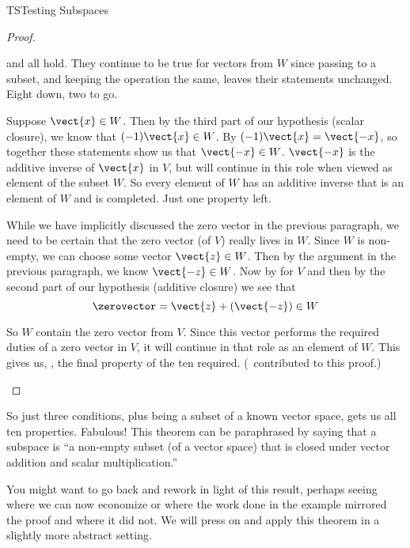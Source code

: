\begin{subsect}{TS}{Testing Subspaces}
\begin{proof}
\begin{para}
 and
all hold.  They continue to be true for vectors from $W$ since passing to a subset, and keeping the operation the same, leaves their statements unchanged.  Eight down, two to go.\end{para}
%
\begin{para}Suppose $\vect{x}\in W$.  Then by the third part of our hypothesis (scalar closure), we know that $(-1)\vect{x}\in W$.  By  $(-1)\vect{x}=\vect{-x}$, so together these statements show us that $\vect{-x}\in W$.  $\vect{-x}$ is the additive inverse of $\vect{x}$ in $V$, but will continue in this role when viewed as element of the subset $W$.  So every element of $W$ has an additive inverse that is an element of $W$ and  is completed.  Just one property left.\end{para}
%
\begin{para}While we have implicitly discussed the zero vector in the previous paragraph, we need to be certain that the zero vector (of $V$) really lives in $W$.   Since $W$ is non-empty, we can choose some vector $\vect{z}\in W$.  Then by the argument in the previous paragraph, we know $\vect{-z}\in W$.  Now by  for $V$ and then by the second part of our hypothesis (additive closure) we see that
%
\begin{equation*}
\zerovector=\vect{z}+(\vect{-z})\in W
\end{equation*}
\end{para}
%
\begin{para}So $W$ contain the zero vector from $V$.  Since this vector performs the required duties of a zero vector in $V$, it will continue in that role as an element of $W$. This gives us, , the final property of the ten required.  (\sarahfellez\ contributed to this proof.)\end{para}
%
\end{proof}
%
\begin{para}So just three conditions, plus being a subset of a known vector space, gets us all ten properties.  Fabulous!
This theorem can be paraphrased by saying that a subspace is ``a non-empty subset (of a vector space) that is closed under vector addition and scalar multiplication.''\end{para}
%
\begin{para}You might want to go back and rework  in light of this result, perhaps seeing where we can now economize or where the work done in the example mirrored the proof and where it did not.  We will press on and apply this theorem in a slightly more abstract setting.\end{para}

\end{subsect}
